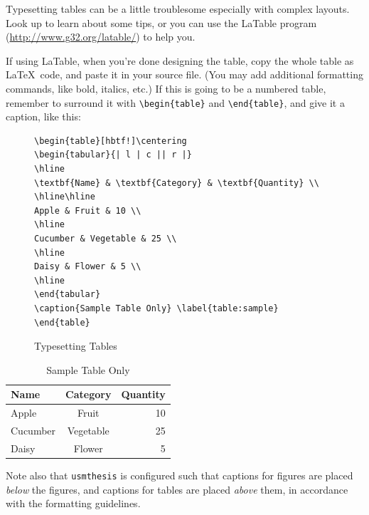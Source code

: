 Typesetting tables can be a little troublesome especially with complex layouts.  Look up \citep{roberts} to learn about some tips, or you can use the \textrm{LaTable} program (\url{http://www.g32.org/latable/}) to help you.

If using \textrm{LaTable}, when you're done designing the table, copy the whole table as \LaTeX\ code, and paste it in your source file.  (You may add additional formatting commands, like bold, italics, etc.)  If this is going to be a numbered table, remember to surround it with \verb|\begin{table}| and \verb|\end{table}|, and give it a caption, like this:

\begin{figure}[hbtf!]
\begin{lstlisting}
\begin{table}[hbtf!]\centering
\begin{tabular}{| l | c || r |}
\hline
\textbf{Name} & \textbf{Category} & \textbf{Quantity} \\ 
\hline\hline
Apple & Fruit & 10 \\ 
\hline
Cucumber & Vegetable & 25 \\ 
\hline
Daisy & Flower & 5 \\ 
\hline
\end{tabular}
\caption{Sample Table Only} \label{table:sample}
\end{table}
\end{lstlisting}
\caption{Typesetting Tables}\label{fig:lst:table}
\end{figure}

\begin{table}[hbtf!]\centering
\begin{tabular}{| l | c || r |}
\hline
\textbf{Name} & \textbf{Category} & \textbf{Quantity} \\ 
\hline\hline
Apple & Fruit & 10 \\ 
\hline
Cucumber & Vegetable & 25 \\ 
\hline
Daisy & Flower & 5 \\ 
\hline
\end{tabular}
\caption{Sample Table Only} \label{table:sample}
\end{table}

Note also that \verb|usmthesis| is configured such that captions for figures are placed \emph{below} the figures, and captions for tables are placed \emph{above} them, in accordance with the formatting guidelines.

